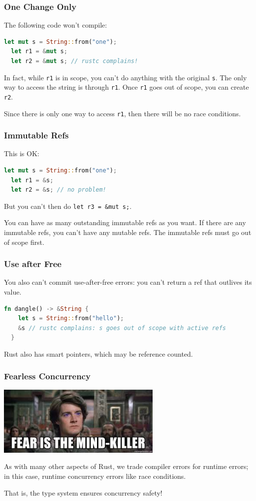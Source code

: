 \begin{frame}[fragile]
\frametitle{One Change Only}

The following code won't compile:
\begin{lstlisting}[language=Rust]
  let mut s = String::from("one");
  let r1 = &mut s;
  let r2 = &mut s; // rustc complains!
\end{lstlisting}
In fact, while {\tt r1} is in scope, you can't do anything with the original {\tt s}.
The only way to access the string is through {\tt r1}. Once {\tt r1} goes out of scope,
you can create {\tt r2}.

Since there is only one way to access {\tt r1}, then there will be no race conditions.

\end{frame}

\begin{frame}[fragile]
\frametitle{Immutable Refs}

This is OK:
\begin{lstlisting}[language=Rust]
  let mut s = String::from("one");
  let r1 = &s;
  let r2 = &s; // no problem!
\end{lstlisting}
But you can't then do {\tt let r3 = \&mut s;}.

You can have as many outstanding immutable refs as you want.
If there are any immutable refs, you can't have \alert{any} mutable refs. The immutable
refs must go out of scope first.

\end{frame}


\begin{frame}[fragile]
\frametitle{Use after Free}

You also can't commit use-after-free errors: you can't return a ref that outlives
its value.
\begin{lstlisting}[language=Rust]
  fn dangle() -> &String {
    let s = String::from("hello");
    &s // rustc complains: s goes out of scope with active refs
  }
\end{lstlisting}

Rust also has \alert{smart pointers}, which may be reference counted. 

\end{frame}


\begin{frame}
\frametitle{Fearless Concurrency}
\begin{center}
	\includegraphics[width=0.6\textwidth]{images/mindkiller.jpeg}
\end{center}

As with many other aspects of Rust, we trade compiler errors for runtime
errors; in this case, runtime concurrency errors like race conditions.


That is, the type system ensures concurrency safety!

\end{frame}


